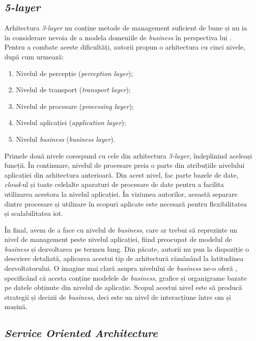 \subsection*{\textit{5-layer}}

Arhitectura \textit{3-layer} nu conține metode de management suficient de bune și nu ia în considerare nevoia de a modela domeniile de \textit{business} în perspectiva lui \citet{MiaoWu2010}. Pentru a combate aceste dificultăți, autorii propun o arhitectura cu cinci nivele, după cum urmează:

\begin{enumerate}
    \item Nivelul de percepție (\textit{perception layer});
    \item Nivelul de transport (\textit{transport layer});
    \item Nivelul de procesare (\textit{processing layer});
    \item Nivelul aplicației (\textit{application layer});
    \item Nivelul \textit{business} (\textit{business layer}).
\end{enumerate}

Primele două nivele corespund cu cele din arhitectura \textit{3-layer}, îndeplinind aceleași funcții. În continuare, nivelul de procesare preia o parte din atribuțiile nivelului aplicației din arhitectura anterioară. Din acest nivel, fac parte bazele de date, \textit{cloud}-ul și toate celelalte aparaturi de procesare de date pentru a facilita utilizarea acestora la nivelul aplicației. În viziunea autorilor, această separare dintre procesare și utilizare în scopuri aplicate este necesară pentru flexibilitatea și scalabilitatea \acrshort{iot}.

În final, avem de a face cu nivelul de \textit{business}, care ar trebui să reprezinte un nivel de management peste nivelul aplicației, fiind preocupat de modelul de \textit{business} și dezvoltarea pe termen lung. Din păcate, autorii nu pun la dispoziție o descriere detaliată, aplicarea acestui tip de arhitectură rămânând la latitudinea dezvoltatorului. O imagine mai clară asupra nivelului de \textit{business} ne-o oferă \citet{Khan2012}, specificând că acesta conține modelele de \textit{business}, grafice și organigrame bazate pe datele obținute din nivelul de aplicație. Scopul acestui nivel este să producă strategii și decizii de \textit{business}, deci este un nivel de interacțiune între om și mașină.

\subsection*{\textit{Service Oriented Architecture}}


